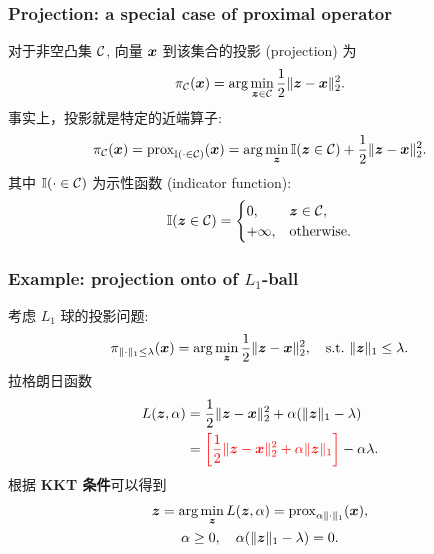 \documentclass{beamer}
\begin{document}
\begin{frame}[fragile]
    \frametitle{Projection: a special case of proximal operator}
    对于非空凸集 ${\mathcal C}$, 向量 ${\bm x}$ 到该集合的投影 (projection) 为
    \begin{equation}
        \pi_{{\mathcal C}}({\bm x})=\arg\min_{{\bm z}\in{\mathcal C}}\frac12\|{\bm z}-{\bm x}\|_2^2.
    \end{equation}
    事实上，投影就是特定的近端算子:
    \begin{equation}
        \pi_{{\mathcal C}}({\bm x})=\mathrm{prox}_{{\mathbb I}(\cdot\in{\mathcal C})}({\bm x})=\arg\min_{{\bm z}}{\mathbb I}({\bm z}\in{\mathcal C})+\frac12\|{\bm z}-{\bm x}\|_2^2.
    \end{equation}
    其中 ${\mathbb I}(\cdot\in{\mathcal C})$ 为示性函数 (indicator function):
    \begin{equation}
        {\mathbb I}({\bm z}\in{\mathcal C})=\begin{cases}
            0,      &{\bm z}\in{\mathcal C},\\
            +\infty,&\mathrm{otherwise}.
        \end{cases}
    \end{equation}
\end{frame}

\begin{frame}[fragile]
    \frametitle{Example: projection onto of $L_1$-ball}
    考虑 $L_1$ 球的投影问题:
    \begin{equation}
        \pi_{\|\cdot\|_1\leq\lambda}({\bm x})=\arg\min_{{\bm z}}\frac12\|{\bm z}-{\bm x}\|_2^2,\quad\mathrm{s.t.}~ \|{\bm z}\|_1\leq\lambda.
    \end{equation}
    拉格朗日函数
    \begin{align}
        L({\bm z},\alpha)
        &=\frac12\|{\bm z}-{\bm x}\|_2^2+\alpha(\|{\bm z}\|_1-\lambda)\\
        &={\color{red}\left[\frac12\|{\bm z}-{\bm x}\|_2^2+\alpha\|{\bm z}\|_1\right]}-\alpha\lambda.
    \end{align}
    根据 \textbf{KKT 条件}可以得到
    \begin{gather}
        {\bm z}=\arg\min_{{\bm z}}L({\bm z},\alpha)=\mathrm{prox}_{\alpha\|\cdot\|_1}({\bm x}),\\
        \alpha\geq 0,\quad\alpha(\|{\bm z}\|_1-\lambda)=0.
    \end{gather}
    \vspace{15pt}
\end{frame}
\end{document}
